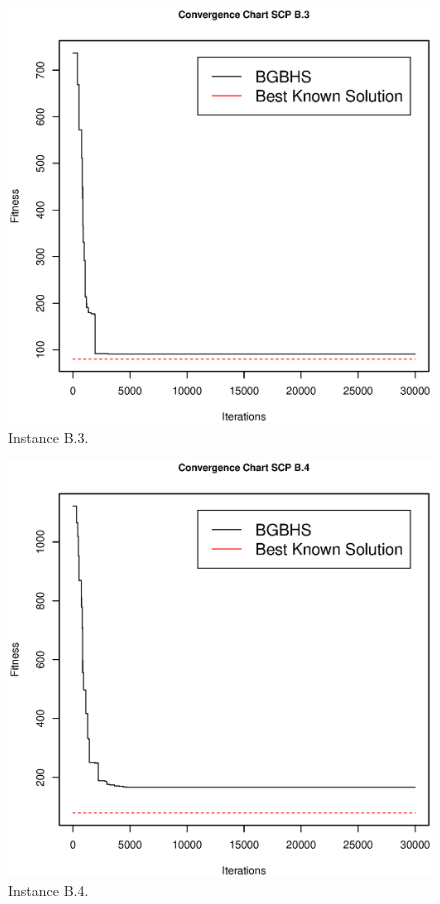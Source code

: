 \clearpage

\begin{figure}[]
\centering
\includegraphics[scale=.45]{Resultados/scpB3.eps}
\caption{Instance B.3.}
\label{fig:Instance.B.3}
\end{figure}

\begin{figure}[]
\centering
\includegraphics[scale=.45]{Resultados/scpB4.eps}
\caption{Instance B.4.}
\label{fig:Instance.B.4}
\end{figure}

